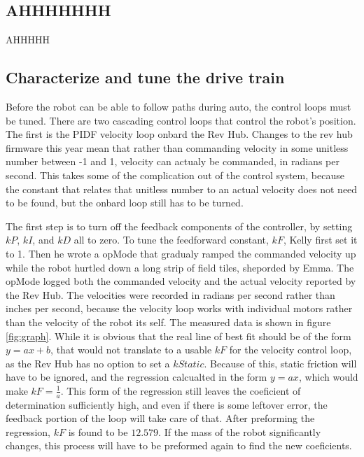 \documentclass{article}
\begin{document}
\subsection {AHHHHHHH}
AHHHHH

\subsection {Characterize and tune the drive train}

Before the robot can be able to follow paths during auto, the control loops must be tuned. There are two cascading control loops that control the robot's position. The first is the PIDF velocity loop onbard the Rev Hub. Changes to the rev hub firmware this year mean that rather than commanding velocity in some unitless number between -1 and 1, velocity can actualy be commanded, in radians per second. This takes some of the complication out of the control system, because the constant that relates that unitless number to an actual velocity does not need to be found, but the onbard loop still has to be turned. 

The first step is to turn off the feedback components of the controller, by setting $kP$, $kI$, and $kD$ all to zero. To tune the feedforward constant, $kF$, Kelly first set it to 1. Then he wrote a opMode that gradualy ramped the commanded velocity up while the robot hurtled down a long strip of field tiles, sheporded by Emma. The opMode logged both the commanded velocity and the actual velocity reported by the Rev Hub. The velocities were recorded in radians per second rather than inches per second, because the velocity loop works with individual motors rather than the velocity of the robot its self. The measured data is shown in figure \ref{fig:graph}. While it is obvious that the real line of best fit should be of the form $y=ax+b$, that would not translate to a usable $kF$ for the velocity control loop, as the Rev Hub has no option to set a $kStatic$. Because of this, static friction will have to be ignored, and the regression calcualted in the form $y=ax$, which would make $kF = \frac{1}{a}$. This form of the regression still leaves the coeficient of determination sufficiently high, and even if there is some leftover error, the feedback portion of the loop will take care of that. After preforming the regression, $kF$ is found to be $12.579$. If the mass of the robot significantly changes, this process will have to be preformed again to find the new coeficients.
\end{document}
